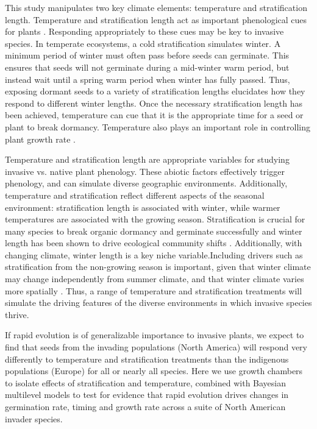 \documentclass[12pt]{article}\usepackage[]{graphicx}\usepackage[]{color}
\begin{document}
	This study manipulates two key climate elements: temperature and stratification length. Temperature and stratification length act as important phenological cues for plants \parencite{Finch2006}. Responding appropriately to these cues may be key to invasive species. In temperate ecosystems, a cold stratification simulates winter. A minimum period of winter must often pass before seeds can germinate. This ensures that seeds will not germinate during a mid-winter warm period, but instead wait until a spring warm period when winter has fully passed. Thus, exposing dormant seeds to a variety of stratification lengths elucidates how they respond to different winter lengths. Once the necessary stratification length has been achieved, temperature can cue that it is the appropriate time for a seed or plant to break dormancy. Temperature also plays an important role in controlling plant growth rate \parencite{Egli1980,Guilioni2003}.
	
	Temperature and stratification length are appropriate variables for studying invasive vs. native plant phenology. These abiotic factors effectively trigger phenology, and can simulate diverse geographic environments. Additionally, temperature and stratification reflect different aspects of the seasonal environment: stratification length is associated with winter, while warmer temperatures are associated with the growing season. Stratification is crucial for many species to break organic dormancy and germinate successfully \parencite{Baskin1998,Popay1970,Wulff1994} and winter length has been shown to drive ecological community shifts \parencite{Harte2015}. Additionally, with changing climate, winter length is a key niche variable.Including drivers such as stratification from the non-growing season is important, given that winter climate may change independently from summer climate, and that winter climate varies more spatially \parencite{Bonan2003}. Thus, a range of temperature and stratification treatments will simulate the driving features of the diverse environments in which invasive species thrive. 
	
	 If rapid evolution is of generalizable importance to invasive plants, we expect to find that seeds from the invading populations (North America) will respond very differently to temperature and stratification treatments than the indigenous populations (Europe) for all or nearly all species. Here we use growth chambers to isolate effects of stratification and temperature, combined with Bayesian multilevel models to test for evidence that rapid evolution drives changes in germination rate, timing and growth rate across a suite of North American invader species. %
	 
\end{document}
